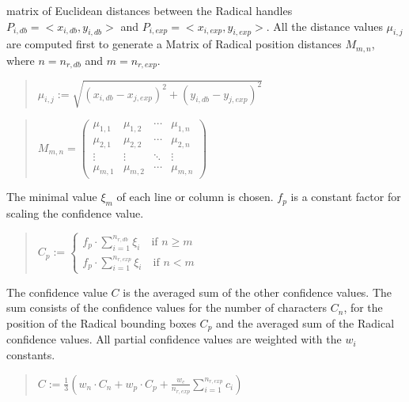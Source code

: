 matrix of Euclidean distances between the Radical handles 
\(P_{i,db} = <x_{i,db},y_{i,db}> \) and 
\(P_{i,exp} = <x_{i,exp}, y_{i,exp}> \). All the distance values \( \mu_{i,j}\) are 
computed first to generate a Matrix of Radical position distances 
\( M_{m,n}\), where
\( n = n_{r,db} \) and \( m = n_{r,exp} \).
\begin{quote}
\(
   \mu_{i,j} := \sqrt{(x_{i,db}-x_{j,exp})^2 + (y_{i,db}-y_{j,exp})^2}
\)
\end{quote}
\begin{quote}
\(
  M_{m,n} = 
  \begin{pmatrix}
   \mu_{1,1} & \mu_{1,2} & \cdots & \mu_{1,n} \\
   \mu_{2,1} & \mu_{2,2} & \cdots & \mu_{2,n} \\
   \vdots  & \vdots  & \ddots & \vdots  \\
   \mu_{m,1} & \mu_{m,2} & \cdots & \mu_{m,n} 
  \end{pmatrix}
\)
\end{quote}
The minimal value \( \xi_m \) of each line or column is chosen.
\( f_p \) is a constant factor for scaling the confidence value.
\begin{quote}
\(
  C_p := 
  \begin{cases}
    f_p \cdot \sum\limits_{i=1}^{n_{r,db}} \xi_i \quad \text{if } n \geq m \\
    f_p \cdot \sum\limits_{i=1}^{n_{r,exp}} \xi_i \quad \text{if } n < m
  \end{cases}
\)
\end{quote}
The confidence value \( C \) is the averaged sum of the other confidence
values. The sum consists of the confidence
values for the number of characters \( C_n\),
for the position of the Radical bounding boxes \( C_p\)
and the averaged sum of the Radical confidence values.
All partial confidence values are weighted with the \(w_i\) constants.
\begin{quote}
\(
    C := \frac{1}{3}
    (w_n \cdot C_n + w_p \cdot C_p + 
     \frac{w_c}{n_{r,exp}} \sum\limits_{i=1}^{n_{r,exp}} c_{i} )
\)
\end{quote}


  


